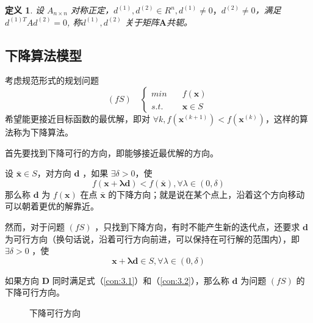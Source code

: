 \documentclass{book}
\newtheorem{definition}{\indent 定义}[chapter]
\begin{document}
\begin{definition}
    \label{def:conjugate_direction}
    设 $A_{n\times n}$ 对称正定，$d^{(1)},d^{(2)} \in R^n,d^{(1)} \ne 0，d^{(2)} \ne 0$，满足$d^{(1)T}Ad^{(2)}=0$, 称$d^{(1)},d^{(2)}$ 关于矩阵$\boldsymbol{A}$共轭。
\end{definition}

\subsection{下降算法模型}

考虑规范形式的规划问题 $$
    (fS)\quad\begin{cases}
        min\quad  & f(\boldsymbol{x})   \\
        s.t.\quad & \boldsymbol{x}\in S
    \end{cases}
$$
希望能更接近目标函数的最优解，即对 $\forall k,f(\boldsymbol{x}^{(k+1)})<f(\boldsymbol{x}^{(k)})$，这样的算法称为下降算法。

首先要找到下降可行的方向，即能够接近最优解的方向。

设 $\bar{\boldsymbol{x}}\in S$，对方向 $\boldsymbol{d}$ ，如果 $\exists\delta>0$，使 \begin{equation}
    f(\boldsymbol{x}+\boldsymbol{\lambda d})<f(\bar{\boldsymbol{x}}),\forall\lambda\in(0,\delta)
    \label{con:3.1}
\end{equation}
那么称 $\boldsymbol{d}$ 为 $f(\boldsymbol{x})$ 在点 $\bar{\boldsymbol{x}}$ 的下降方向；就是说在某个点上，沿着这个方向移动可以朝着更优的解靠近。

然而，对于问题 $(fS)$ ，只找到下降方向，有时不能产生新的迭代点，还要求 $\boldsymbol{d}$ 为可行方向（换句话说，沿着可行方向前进，可以保持在可行解的范围内），即 $\exists\delta>0$ ，使
\begin{equation}
    \boldsymbol{x}+\boldsymbol{\lambda d}\in S,\forall\lambda\in(0,\delta)
    \label{con:3.2}
\end{equation}

如果方向 $\boldsymbol{D}$ 同时满足式（\ref{con:3.1}）和（\ref{con:3.2}），那么称 $\boldsymbol{d}$ 为问题 $(fS)$ 的下降可行方向。

\begin{figure}[ht]
    \centering
    \caption{下降可行方向}
    \label{fig:Feasible Descent Direction}
\end{figure}
\end{document}

